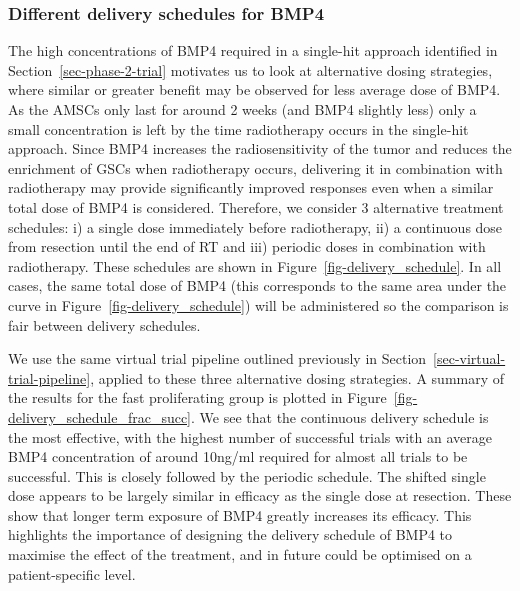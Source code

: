 \documentclass[
  default,
]{sn-jnl}
\begin{document}
\subsubsection{Different delivery schedules for
BMP4}\label{different-delivery-schedules-for-bmp4}

The high concentrations of BMP4 required in a single-hit approach
identified in Section~\ref{sec-phase-2-trial} motivates us to look at
alternative dosing strategies, where similar or greater benefit may be
observed for less average dose of BMP4. As the AMSCs only last for
around 2 weeks (and BMP4 slightly less) only a small concentration is
left by the time radiotherapy occurs in the single-hit approach. Since
BMP4 increases the radiosensitivity of the tumor and reduces the
enrichment of GSCs when radiotherapy occurs, delivering it in
combination with radiotherapy may provide significantly improved
responses even when a similar total dose of BMP4 is considered.
Therefore, we consider 3 alternative treatment schedules: i) a single
dose immediately before radiotherapy, ii) a continuous dose from
resection until the end of RT and iii) periodic doses in combination
with radiotherapy. These schedules are shown in
Figure~\ref{fig-delivery_schedule}. In all cases, the same total dose of
BMP4 (this corresponds to the same area under the curve in
Figure~\ref{fig-delivery_schedule}) will be administered so the
comparison is fair between delivery schedules.

We use the same virtual trial pipeline outlined previously in
Section~\ref{sec-virtual-trial-pipeline}, applied to these three
alternative dosing strategies. A summary of the results for the fast
proliferating group is plotted in
Figure~\ref{fig-delivery_schedule_frac_succ}. We see that the continuous
delivery schedule is the most effective, with the highest number of
successful trials with an average BMP4 concentration of around 10ng/ml
required for almost all trials to be successful. This is closely
followed by the periodic schedule. The shifted single dose appears to be
largely similar in efficacy as the single dose at resection. These show
that longer term exposure of BMP4 greatly increases its efficacy. This
highlights the importance of designing the delivery schedule of BMP4 to
maximise the effect of the treatment, and in future could be optimised
on a patient-specific level.
\end{document}
